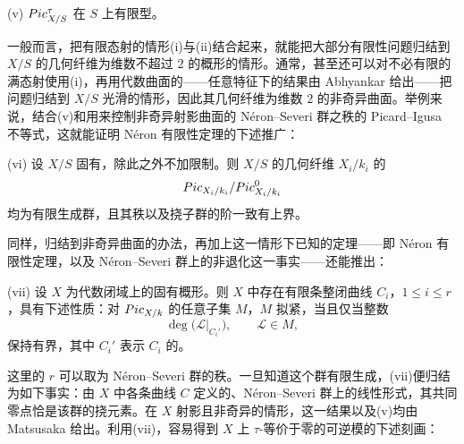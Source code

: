 \begin{statement}{(v)}
$Pic^\tau_{X/S}$ 在 $S$ 上有限型。
\end{statement}

一般而言，把有限态射的情形(i)与(ii)结合起来，就能把大部分有限性问题归结到 $X/S$ 的几何纤维为维数不超过 $2$ 的概形的情形。通常，甚至还可以对不必有限的满态射使用(i)，再用代数曲面的——任意特征下的结果由 Abhyankar 给出——把问题归结到 $X/S$ 光滑的情形，因此其几何纤维为维数 $2$ 的非奇异曲面。举例来说，结合(v)和用来控制非奇异射影曲面的 Néron--Severi 群之秩的 Picard--Igusa 不等式，这就能证明 Néron 有限性定理的下述推广：

\begin{statement}{(vi)}
设 $X/S$ 固有，除此之外不加限制。则 $X/S$ 的几何纤维 $X_i/k_i$ 的
\[
Pic_{X_i/k_i}/Pic^0_{X_i/k_i}
\]
均为有限生成群，且其秩以及挠子群的阶一致有上界。
\end{statement}

同样，归结到非奇异曲面的办法，再加上这一情形下已知的定理——即 Néron 有限性定理，以及 Néron--Severi 群上的非退化这一事实——还能推出：

\begin{statement}{(vii)}
设 $X$ 为代数闭域上的固有概形。则 $X$ 中存在有限条整闭曲线 $C_i$，$1\le i\le r$，具有下述性质：对 $Pic_{X/k}$ 的任意子集 $M$，$M$ 拟紧，当且仅当整数
\[
\deg\bigl(\mathcal L|_{C_i'}\bigr),\qquad \mathcal L\in M,
\]
保持有界，其中 $C_i'$ 表示 $C_i$ 的。
\end{statement}

这里的 $r$ 可以取为 Néron--Severi 群的秩。一旦知道这个群有限生成，(vii)便归结为如下事实：由 $X$ 中各条曲线 $C$ 定义的、Néron--Severi 群上的线性形式，其共同零点恰是该群的挠元素。在 $X$ 射影且非奇异的情形，这一结果以及(v)均由 Matsusaka 给出。利用(vii)，容易得到 $X$ 上 $\tau$-等价于零的可逆模的下述刻画：


